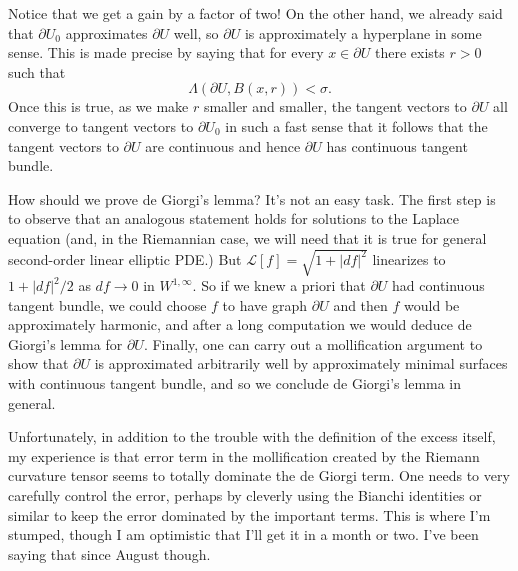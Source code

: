 \documentclass[reqno,12pt,letterpaper]{amsart}
\theoremstyle{definition}
\begin{document}
Notice that we get a gain by a factor of two!
On the other hand, we already said that $\partial U_0$ approximates $\partial U$ well, so $\partial U$ is approximately a hyperplane in some sense.
This is made precise by saying that for every $x \in \partial U$ there exists $r > 0$ such that
$$\Lambda(\partial U, B(x, r)) < \sigma.$$
Once this is true, as we make $r$ smaller and smaller, the tangent vectors to $\partial U$ all converge to tangent vectors to $\partial U_0$ in such a fast sense that it follows that the tangent vectors to $\partial U$ are continuous and hence $\partial U$ has continuous tangent bundle.

How should we prove de Giorgi's lemma?
It's not an easy task.
The first step is to observe that an analogous statement holds for solutions to the Laplace equation (and, in the Riemannian case, we will need that it is true for general second-order linear elliptic PDE.)
But $\mathscr L[f] = \sqrt{1 + |df|^2}$ linearizes to $1 + |df|^2/2$ as $df \to 0$ in $W^{1, \infty}$.
So if we knew a priori that $\partial U$ had continuous tangent bundle, we could choose $f$ to have graph $\partial U$ and then $f$ would be approximately harmonic, and after a long computation we would deduce de Giorgi's lemma for $\partial U$.
Finally, one can carry out a mollification argument to show that $\partial U$ is approximated arbitrarily well by approximately minimal surfaces with continuous tangent bundle, and so we conclude de Giorgi's lemma in general.

Unfortunately, in addition to the trouble with the definition of the excess itself, my experience is that error term in the mollification created by the Riemann curvature tensor seems to totally dominate the de Giorgi term.
One needs to very carefully control the error, perhaps by cleverly using the Bianchi identities or similar to keep the error dominated by the important terms.
This is where I'm stumped, though I am optimistic that I'll get it in a month or two.
I've been saying that since August though.



\printbibliography
\end{document}
